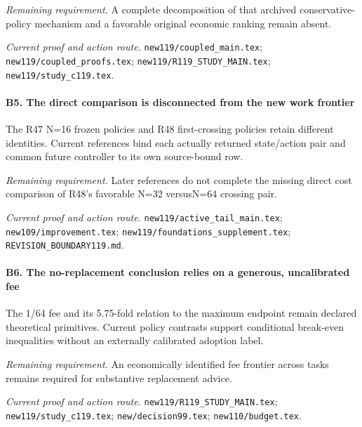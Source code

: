 \par\emph{Remaining requirement.} A complete decomposition of that archived conservative-policy mechanism and a favorable original economic ranking remain absent.

\par\emph{Current proof and action route.} \nolinkurl{new119/coupled_main.tex}; \nolinkurl{new119/coupled_proofs.tex}; \nolinkurl{new119/R119_STUDY_MAIN.tex}; \nolinkurl{new119/study_c119.tex}.

\paragraph{B5. The direct comparison is disconnected from the new work frontier}

The R47 N=16 frozen policies and R48 first-crossing policies retain different identities. Current references bind each actually returned state/\allowbreak{}action pair and common future controller to its own source-bound row.

\par\emph{Remaining requirement.} Later references do not complete the missing direct cost comparison of R48's favorable N=32 versusN=64 crossing pair.

\par\emph{Current proof and action route.} \nolinkurl{new119/active_tail_main.tex}; \nolinkurl{new109/improvement.tex}; \nolinkurl{new119/foundations_supplement.tex}; \nolinkurl{REVISION_BOUNDARY119.md}.

\paragraph{B6. The no-replacement conclusion relies on a generous, uncalibrated fee}

The 1/64 fee and its 5.75-fold relation to the maximum endpoint remain declared theoretical primitives. Current policy contrasts support conditional break-even inequalities without an externally calibrated adoption label.

\par\emph{Remaining requirement.} An economically identified fee frontier across tasks remains required for substantive replacement advice.

\par\emph{Current proof and action route.} \nolinkurl{new119/R119_STUDY_MAIN.tex}; \nolinkurl{new119/study_c119.tex}; \nolinkurl{new/decision99.tex}; \nolinkurl{new110/budget.tex}.

